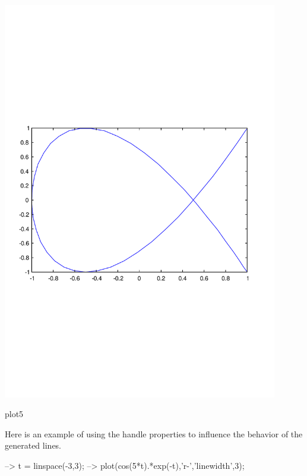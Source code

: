  
\begin{DoxyImage}
\includegraphics[width=12cm]{plot5}
\caption{plot5}
\end{DoxyImage}


Here is an example of using the handle properties to influence the behavior of the generated lines.


\begin{DoxyVerbInclude}
--> t = linspace(-3,3);
--> plot(cos(5*t).*exp(-t),'r-','linewidth',3);
\end{DoxyVerbInclude}


